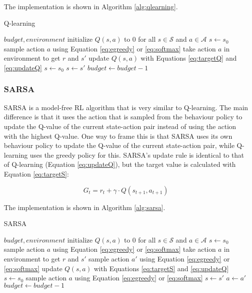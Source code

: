 \documentclass{article}
\begin{document}
The implementation is shown in Algorithm \ref{alg:qlearning}.

\begin{algorithm}[htbp]
    \caption{Q-learning}
    \label{alg:qlearning}
 \begin{algorithmic}
     $budget, environment$
    \STATE initialize $Q(s, a)$ to $0$ for all $s \in \mathcal{S}$ and $a \in \mathcal{A}$
    \STATE $s \gets s_0$
    \REPEAT
    \STATE sample action $a$ using Equation \ref{eq:egreedy} or \ref{eq:softmax}
    \STATE take action $a$ in environment to get $r$ and $s'$
    \STATE update $Q(s, a)$ with Equations \ref{eq:targetQ} and \ref{eq:updateQ}
        \STATE $s \gets s_0$
    \ELSE
        \STATE $s \gets s'$
    \ENDIF
    \STATE $budget \gets budget - 1$
\end{algorithmic}
\end{algorithm}

\subsubsection*{SARSA}
\label{sssec:sarsa}

SARSA is a model-free RL algorithm that is very similar to Q-learning.
The main difference is that it uses the action that is sampled from the behaviour policy to update the Q-value of the current state-action pair instead of using the action with the highest Q-value.
One way to frame this is that SARSA uses its own behaviour policy to update the Q-value of the current state-action pair, while Q-learning uses the greedy policy for this.
SARSA's update rule is identical to that of Q-learning (Equation \ref{eq:updateQ}), but the target value is calculated with Equation \ref{eq:targetS}:

\begin{equation}
    G_t = r_t + \gamma \cdot Q(s_{t+1}, a_{t+1})
    \label{eq:targetS}
\end{equation}

The implementation is shown in Algorithm \ref{alg:sarsa}.

\begin{algorithm}[htbp]
    \caption{SARSA}
    \label{alg:sarsa}
 \begin{algorithmic}
     $budget, environment$
    \STATE initialize $Q(s, a)$ to $0$ for all $s \in \mathcal{S}$ and $a \in \mathcal{A}$
    \STATE $s \gets s_0$
    \STATE sample action $a$ using Equation \ref{eq:egreedy} or \ref{eq:softmax}
    \REPEAT
    \STATE take action $a$ in environment to get $r$ and $s'$
    \STATE sample action $a'$ using Equation \ref{eq:egreedy} or \ref{eq:softmax}
    \STATE update $Q(s, a)$ with Equations \ref{eq:targetS} and \ref{eq:updateQ}
        \STATE $s \gets s_0$
        \STATE sample action $a$ using Equation \ref{eq:egreedy} or \ref{eq:softmax}
    \ELSE
        \STATE $s \gets s'$
        \STATE $a \gets a'$
    \ENDIF
    \STATE $budget \gets budget - 1$
\end{algorithmic}
\end{algorithm}
\end{document}
